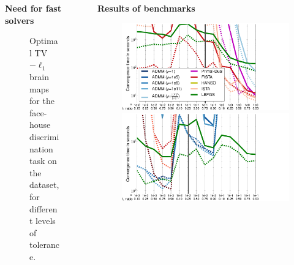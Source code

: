 \documentclass[french]{STIC_poster}
\begin{document}
\begin{frame}[t]
\begin{columns}[t]
\begin{column}{.48\linewidth}
\begin{nbox}[\textwidth]{\textbf{Need for fast solvers}}
\begin{itemize}
\begin{figure}
                                    \caption{Optimal TV$-\ell_1$ brain maps for the face-house discrimination task on
                                      the \textcolor{cyan}{\cite{haxby2001}} dataset, for different levels of tolerance. \textcolor{cyan}{\cite{dohmatob2014benchmarking}}}%
                                    \label{fig:maps_tolerance}
                                  \end{figure}
                                  \end{itemize}
                                  \end{nbox}
			\end{column}
			\hfill
			\begin{column}{.48\linewidth}
			  \begin{nbox}[\textwidth]{\textbf{Results of benchmarks}}
                            \begin{figure}
                              \includegraphics[width=1.2\linewidth]{bench/haxby_mse.pdf}%
                              \hspace{-.09\linewidth}%
                              \includegraphics[width=1.2\linewidth]{bench/haxby_lr.pdf}

\end{figure}
\end{nbox}
\end{column}
\end{columns}
\end{frame}
\end{document}
